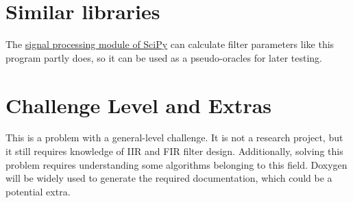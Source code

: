 \documentclass{article}
\begin{document}
\section{Similar libraries}

The \href{https://docs.scipy.org/doc/scipy-1.15.0/reference/signal.html} {signal processing module of SciPy} can calculate filter parameters like this program partly does, so it can be used as a pseudo-oracles for later testing.

\section{Challenge Level and Extras}

This is a problem with a general-level challenge. It is not a research project, but it still requires knowledge of IIR and FIR filter design. Additionally, solving this problem requires understanding some algorithms belonging to this field. Doxygen will be widely used to generate the required documentation, which could be a potential extra.
\end{document}
